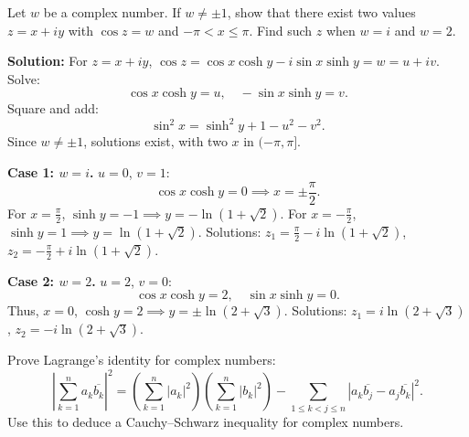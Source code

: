 \begin{problembox}
Let \( w \) be a complex number. If \( w \ne \pm 1 \), show that there exist two values \( z = x + iy \) with \( \cos z = w \) and \( -\pi < x \leq \pi \). Find such \( z \) when \( w = i \) and \( w = 2 \).
\end{problembox}

\textbf{Solution:}
For \( z = x + iy \), \( \cos z = \cos x \cosh y - i \sin x \sinh y = w = u + iv \). Solve:
\[
\cos x \cosh y = u, \quad -\sin x \sinh y = v.
\]
Square and add:
\[
\sin^2 x = \sinh^2 y + 1 - u^2 - v^2.
\]
Since \( w \neq \pm 1 \), solutions exist, with two \( x \) in \( (-\pi, \pi] \).

\textbf{Case 1: \( w = i \).} \( u = 0 \), \( v = 1 \):
\[
\cos x \cosh y = 0 \implies x = \pm \frac{\pi}{2}.
\]
For \( x = \frac{\pi}{2} \), \( \sinh y = -1 \implies y = -\ln(1 + \sqrt{2}) \).
For \( x = -\frac{\pi}{2} \), \( \sinh y = 1 \implies y = \ln(1 + \sqrt{2}) \).
Solutions: \( z_1 = \frac{\pi}{2} - i \ln(1 + \sqrt{2}) \), \( z_2 = -\frac{\pi}{2} + i \ln(1 + \sqrt{2}) \).

\textbf{Case 2: \( w = 2 \).} \( u = 2 \), \( v = 0 \):
\[
\cos x \cosh y = 2, \quad \sin x \sinh y = 0.
\]
Thus, \( x = 0 \), \( \cosh y = 2 \implies y = \pm \ln(2 + \sqrt{3}) \).
Solutions: \( z_1 = i \ln(2 + \sqrt{3}) \), \( z_2 = -i \ln(2 + \sqrt{3}) \).

\begin{problembox}
Prove Lagrange’s identity for complex numbers:
\[
\left| \sum_{k=1}^n a_k \overline{b_k} \right|^2 = \left( \sum_{k=1}^n |a_k|^2 \right) \left( \sum_{k=1}^n |b_k|^2 \right) - \sum_{1 \leq k < j \leq n} |a_k \overline{b_j} - a_j \overline{b_k}|^2.
\]
Use this to deduce a Cauchy–Schwarz inequality for complex numbers.
\end{problembox}

